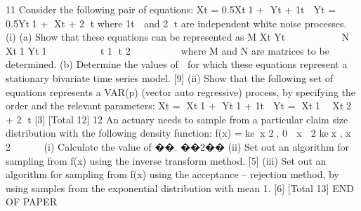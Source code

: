 \documentclass[a4paper,12pt]{article}
\begin{document}
11 Consider the following pair of equations:
  Xt = 0.5Xt1 + Yt + 1t
  
  Yt = 0.5Yt1 + Xt + 2
  t
  where 1t
   and 2
  t are independent white noise processes.
  (i) (a) Show that these equations can be represented as
  M
  Xt
  Yt
  
  
  
  
  
  
   N
  Xt1
  Yt1
  
  
  
  
  
  
  
  t
  1
  t
  2
  
  
  
  
  
  
  where M and N are matrices to be determined.
  (b) Determine the values of  for which these equations represent a
  stationary bivariate time series model. [9]
  (ii) Show that the following set of equations represents a VAR(p) (vector auto
                                                                     regressive) process, by specifying the order and the relevant parameters:
    Xt = Xt1 + Yt1 + 1t
  
  Yt = Xt1  Xt2 + 2
  t
  [3]
  [Total 12]
  12 An actuary needs to sample from a particular claim size distribution with the
  following density function:
    f(x) = kex 2, 0  x  2
  kex , x  2
  
   
   
  (i) Calculate the value of ��. ��2��
  (ii) Set out an algorithm for sampling from f(x) using the inverse transform
  method. [5]
  (iii) Set out an algorithm for sampling from f(x) using the acceptance – rejection
  method, by using samples from the exponential distribution with mean 1. [6]
  [Total 13]
  END OF PAPER
  
\end{document}
